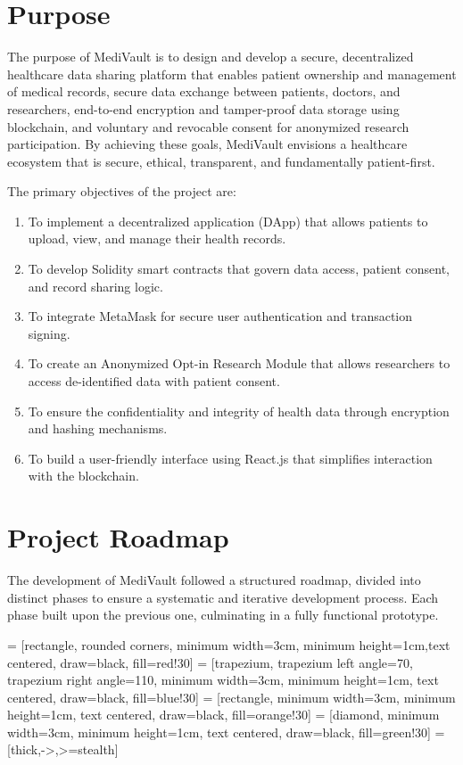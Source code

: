 \section{Purpose}
The purpose of MediVault is to design and develop a secure, decentralized healthcare data sharing platform that enables patient ownership and management of medical records, secure data exchange between patients, doctors, and researchers, end-to-end encryption and tamper-proof data storage using blockchain, and voluntary and revocable consent for anonymized research participation. By achieving these goals, MediVault envisions a healthcare ecosystem that is secure, ethical, transparent, and fundamentally patient-first.

The primary objectives of the project are:
\begin{enumerate}
    \item To implement a decentralized application (DApp) that allows patients to upload, view, and manage their health records.
    \item To develop Solidity smart contracts that govern data access, patient consent, and record sharing logic.
    \item To integrate MetaMask for secure user authentication and transaction signing.
    \item To create an Anonymized Opt-in Research Module that allows researchers to access de-identified data with patient consent.
    \item To ensure the confidentiality and integrity of health data through encryption and hashing mechanisms.
    \item To build a user-friendly interface using React.js that simplifies interaction with the blockchain.
\end{enumerate}

\section{Project Roadmap}
The development of MediVault followed a structured roadmap, divided into distinct phases to ensure a systematic and iterative development process. Each phase built upon the previous one, culminating in a fully functional prototype.

 = [rectangle, rounded corners, minimum width=3cm, minimum height=1cm,text centered, draw=black, fill=red!30]
 = [trapezium, trapezium left angle=70, trapezium right angle=110, minimum width=3cm, minimum height=1cm, text centered, draw=black, fill=blue!30]
 = [rectangle, minimum width=3cm, minimum height=1cm, text centered, draw=black, fill=orange!30]
 = [diamond, minimum width=3cm, minimum height=1cm, text centered, draw=black, fill=green!30]
 = [thick,->,>=stealth]


